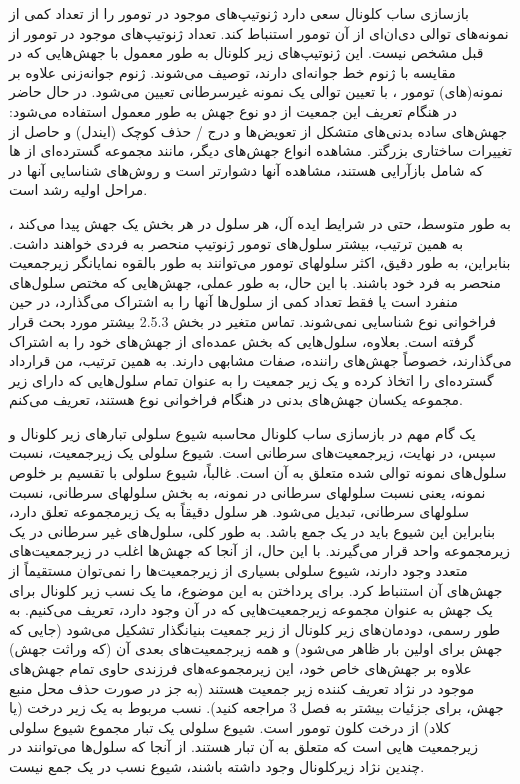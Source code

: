 بازسازی ساب کلونال سعی دارد ژنوتیپ‌های موجود در تومور را از تعداد کمی از نمونه‌های توالی دی‌ان‌ای از آن تومور استنباط کند. تعداد ژنوتیپ‌های موجود در تومور از قبل مشخص نیست. این ژنوتیپ‌های زیر کلونال به طور معمول با جهش‌هایی که در مقایسه با ژنوم خط جوانه‌ای دارند، توصیف می‌شوند. ژنوم جوانه‌زنی علاوه بر نمونه(های) تومور ، با تعیین توالی یک نمونه غیرسرطانی تعیین می‌شود. در حال حاضر در هنگام تعریف این جمعیت از دو نوع جهش به طور معمول استفاده می‌شود: جهش‌های ساده بدنی‌های متشکل از تعویض‌ها و درج / حذف کوچک (ایندل) و  حاصل از تغییرات ساختاری بزرگتر. مشاهده انواع جهش‌های دیگر، مانند مجموعه گسترده‌ای از ‌ها که شامل بازآرایی هستند، مشاهده آنها دشوارتر است و روش‌های شناسایی آنها در مراحل اولیه رشد است.


به طور متوسط، حتی در شرایط ایده آل، هر سلول در هر بخش یک جهش پیدا می‌کند \cite{behjati2014genome}، به همین ترتیب، بیشتر سلول‌های تومور ژنوتیپ منحصر به فردی خواهند داشت. بنابراین، به طور دقیق، اکثر سلولهای تومور می‌توانند به طور بالقوه نمایانگر زیرجمعیت منحصر به فرد خود باشند. با این حال، به طور عملی، جهش‌هایی که مختص سلول‌های منفرد است یا فقط تعداد کمی از سلول‌ها آنها را به اشتراک می‌گذارد، در حین فراخوانی نوع شناسایی نمی‌شوند. تماس متغیر در بخش 2.5.3 بیشتر مورد بحث قرار گرفته است. بعلاوه، سلول‌هایی که بخش عمده‌ای از جهش‌های خود را به اشتراک می‌گذارند، خصوصاً جهش‌های راننده، صفات مشابهی دارند. به همین ترتیب، من قرارداد گسترده‌ای را اتخاذ کرده و یک زیر جمعیت را به عنوان تمام سلول‌هایی که دارای زیر مجموعه یکسان جهش‌های بدنی در هنگام فراخوانی نوع هستند، تعریف می‌کنم.


یک گام مهم در بازسازی ساب کلونال محاسبه شیوع سلولی تبارهای زیر کلونال و سپس، در نهایت، زیرجمعیت‌های سرطانی است. شیوع سلولی یک زیرجمعیت، نسبت سلول‌های نمونه توالی شده متعلق به آن است. غالباً، شیوع سلولی با تقسیم بر خلوص نمونه، یعنی نسبت سلولهای سرطانی در نمونه، به بخش سلولهای سرطانی، نسبت سلولهای سرطانی، تبدیل می‌شود. هر سلول دقیقاً به یک زیرمجموعه تعلق دارد، بنابراین این شیوع باید در یک جمع باشد. به طور کلی، سلول‌های غیر سرطانی در یک زیرمجموعه واحد قرار می‌گیرند. با این حال، از آنجا که جهش‌ها اغلب در زیرجمعیت‌های متعدد وجود دارند، شیوع سلولی بسیاری از زیرجمعیت‌ها را نمی‌توان مستقیماً از جهش‌های آن استنباط کرد. برای پرداختن به این موضوع، ما یک نسب زیر کلونال برای یک جهش به عنوان مجموعه زیرجمعیت‌هایی که در آن وجود دارد، تعریف می‌کنیم. به طور رسمی، دودمان‌های زیر کلونال از زیر جمعیت بنیانگذار تشکیل می‌شود (جایی که جهش برای اولین بار ظاهر می‌شود) و همه زیرجمعیت‌های بعدی آن (که وراثت جهش) علاوه بر جهش‌های خاص خود، این زیرمجموعه‌های فرزندی حاوی تمام جهش‌های موجود در نژاد تعریف کننده زیر جمعیت هستند (به جز در صورت حذف محل منبع جهش، برای جزئیات بیشتر به فصل 3 مراجعه کنید). نسب مربوط به یک زیر درخت (یا کلاد) از درخت کلون تومور است. شیوع سلولی یک تبار مجموع شیوع سلولی زیرجمعیت هایی است که متعلق به آن تبار هستند. از آنجا که سلول‌ها می‌توانند در چندین نژاد زیرکلونال وجود داشته باشند، شیوع نسب در یک جمع نیست.



